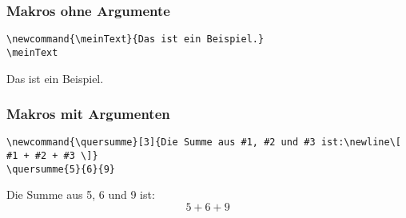 \subsubsection{Makros ohne Argumente}

\begin{minipage}[c]{0.65\textwidth}
    \begin{lstlisting}[language={[LaTeX]TeX}]
\newcommand{\meinText}{Das ist ein Beispiel.}
\meinText
        \end{lstlisting}
\end{minipage}
\hfill
\begin{minipage}[c]{0.3\textwidth}
    \newcommand{\meinText}{Das ist ein Beispiel.}
    \meinText
\end{minipage}

\subsubsection{Makros mit Argumenten}

\begin{minipage}[c]{0.65\textwidth}
    \begin{lstlisting}[language={[LaTeX]TeX}]
\newcommand{\quersumme}[3]{Die Summe aus #1, #2 und #3 ist:\newline\[ #1 + #2 + #3 \]}
\quersumme{5}{6}{9}
        \end{lstlisting}
\end{minipage}
\hfill
\begin{minipage}[c]{0.3\textwidth}
    \newcommand{\quersumme}[3]{Die Summe aus #1, #2 und #3 ist:\newline\[ #1 + #2 + #3 \]}
    \quersumme{5}{6}{9}
\end{minipage}
